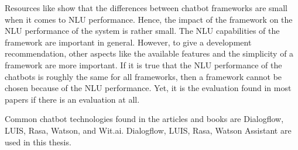 Resources like \citet{braunEvaluatingNLU} show that the differences between chatbot frameworks are small when it comes to NLU performance.
Hence, the impact of the framework on the NLU performance of the system is rather small.
The NLU capabilities of the framework are important in general. 
However, to give a development recommendation, other aspects like the available features and the simplicity of a framework are more important.
If it is true that the NLU performance of the chatbots is roughly the same for all frameworks, then a framework cannot be chosen because of the NLU performance.
Yet, it is the evaluation found in most papers if there is an evaluation at all. 

Common chatbot technologies found in the articles and books are Dialogflow, LUIS,  Rasa, Watson, and Wit.ai.
Dialogflow, LUIS, Rasa, Watson Assistant are used in this thesis.

